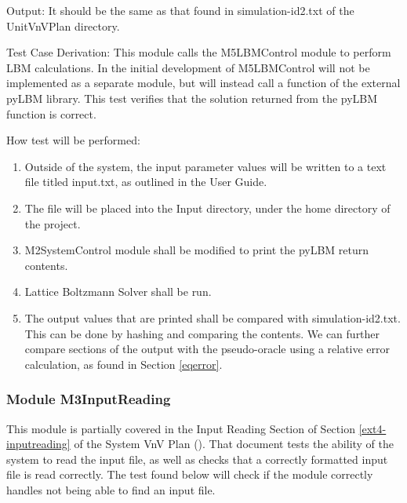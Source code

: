 \documentclass[12pt, titlepage]{article}
\newcommand{\myprogname}{Lattice Boltzmann Solver}
\begin{document}
\begin{enumerate}
	Output: It should be the same as that found in simulation-id2.txt of the UnitVnVPlan directory.
	
	Test Case Derivation: This module calls the M5LBMControl module to perform LBM calculations. In the initial development of {\progname} M5LBMControl will not be implemented as a separate module, but will instead call a function of the external pyLBM library. This test verifies that the solution returned from the pyLBM function is correct.
	
	How test will be performed: 
	\begin{enumerate}
		\item Outside of the system, the input parameter values will be written to a text file titled input.txt, as outlined in the User Guide.
		\item The file will be placed into the Input directory, under the home directory of the project.
		\item M2SystemControl module shall be modified to print the pyLBM return contents.
		\item {\myprogname} shall be run. 
		\item The output values that are printed shall be compared with simulation-id2.txt. This can be done by hashing and comparing the contents. We can further compare sections of the output with the pseudo-oracle using a relative error calculation, as found in Section \ref{eqerror}.
	\end{enumerate}
	
\end{enumerate}

\subsubsection{Module M3InputReading}
\label{inreading}

This module is partially covered in the Input Reading Section of Section \ref{ext4-inputreading} of the System VnV Plan (\citet{LBM_SVNV_PM}). That document tests the ability of the system to read the input file, as well as checks that a correctly formatted input file is read correctly. The test found below will check if the module correctly handles not being able to find an input file.
\end{document}
